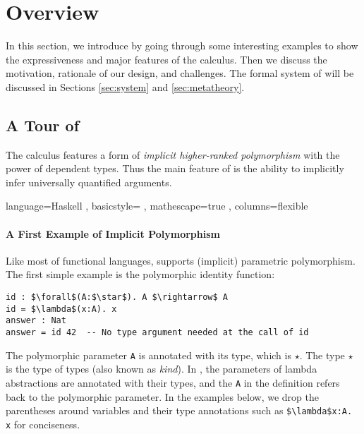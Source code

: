 \section{Overview}

In this section, we introduce \name by going through
some interesting examples to show the expressiveness and major features of the calculus.
Then we discuss the motivation, rationale of our design, and challenges.
The formal system of \name will be
discussed in Sections \ref{sec:system} and \ref{sec:metatheory}.

\subsection{A Tour of \name}
\label{sec:examples}

The \name calculus features a form of \emph{implicit
  higher-ranked polymorphism} with the power of dependent types. Thus the main feature of \name
is the ability to implicitly infer universally quantified arguments.

\lstset
  { language=Haskell
  , basicstyle=\ttfamily
  , mathescape=true
  , columns=flexible}

\paragraph{A First Example of Implicit Polymorphism}
Like most of functional languages, \name supports (implicit) parametric polymorphism.
The first simple example is the polymorphic identity function:
\begin{lstlisting}
id : $\forall$(A:$\star$). A $\rightarrow$ A
id = $\lambda$(x:A). x
answer : Nat
answer = id 42  -- No type argument needed at the call of id
\end{lstlisting}
\noindent The polymorphic parameter \lstinline{A} is annotated with its type,
which is $\star$. The type $\star$ is the type of types (also known as
\emph{kind}). In \name, the parameters of lambda abstractions are annotated
with their types, and the \lstinline{A} in the definition refers back to the
polymorphic parameter. In the examples below, we drop the parentheses around
variables and their type annotations such as \lstinline{$\lambda$x:A. x} for conciseness.

